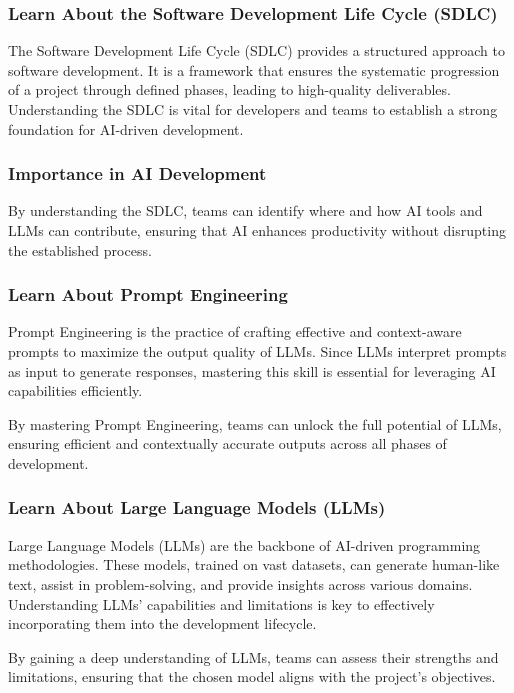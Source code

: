 \documentclass[14pt, a4paper]{article}
\begin{document}
\subsubsection{Learn About the Software Development Life Cycle (SDLC)}

The Software Development Life Cycle (SDLC) provides a structured approach to
software development. It is a framework that ensures the systematic progression
of a project through defined phases, leading to high-quality deliverables.
Understanding the SDLC is vital for developers and teams to establish a strong
foundation for AI-driven development.

\subsubsection*{Importance in AI Development}

By understanding the SDLC, teams can identify where and how AI tools and LLMs
can contribute, ensuring that AI enhances productivity without disrupting the
established process.

\subsubsection{Learn About Prompt Engineering}

Prompt Engineering is the practice of crafting effective and context-aware
prompts to maximize the output quality of LLMs. Since LLMs interpret prompts as
input to generate responses, mastering this skill is essential for leveraging AI
capabilities efficiently.

By mastering Prompt Engineering, teams can unlock the full potential of LLMs,
ensuring efficient and contextually accurate outputs across all phases of
development.

\subsubsection{Learn About Large Language Models (LLMs)}

Large Language Models (LLMs) are the backbone of AI-driven programming
methodologies. These models, trained on vast datasets, can generate human-like
text, assist in problem-solving, and provide insights across various domains.
Understanding LLMs' capabilities and limitations is key to effectively
incorporating them into the development lifecycle.

By gaining a deep understanding of LLMs, teams can assess their strengths and
limitations, ensuring that the chosen model aligns with the project’s
objectives.
\end{document}
